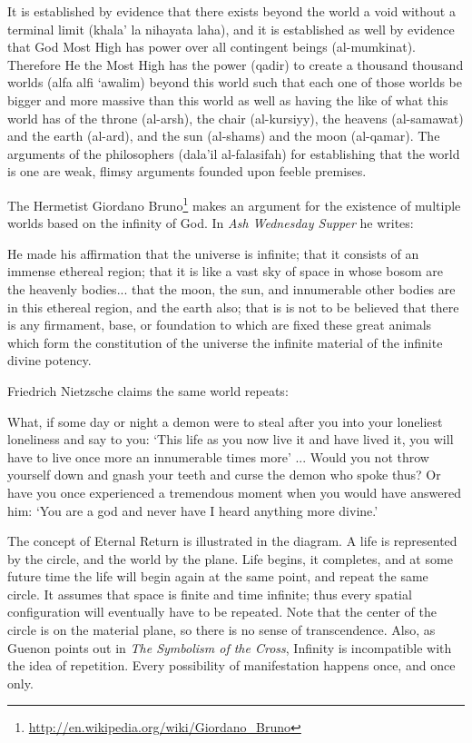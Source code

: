 \begin{quotex}
It is established by evidence that there exists beyond the world a void without a terminal limit (khala' la nihayata laha), and it is established as well by evidence that God Most High has power over all contingent beings (al-mumkinat). Therefore He the Most High has the power (qadir) to create a thousand thousand worlds (alfa alfi `awalim) beyond this world such that each one of those worlds be bigger and more massive than this world as well as having the like of what this world has of the throne (al-arsh), the chair (al-kursiyy), the heavens (al-samawat) and the earth (al-ard), and the sun (al-shams) and the moon (al-qamar). The arguments of the philosophers (dala'il al-falasifah) for establishing that the world is one are weak, flimsy arguments founded upon feeble premises.
\end{quotex}


The Hermetist Giordano Bruno\footnote{\url{http://en.wikipedia.org/wiki/Giordano_Bruno}} makes an argument for the existence of multiple worlds based on the infinity of God. In \emph{Ash Wednesday Supper} he writes:

\begin{quotex} He made his affirmation that the universe is infinite; that it consists of an immense ethereal region; that it is like a vast sky of space in whose bosom are the heavenly bodies... that the moon, the sun, and innumerable other bodies are in this ethereal region, and the earth also; that is is not to be believed that there is any firmament, base, or foundation to which are fixed these great animals which form the constitution of the universe the infinite material of the infinite divine potency.
\end{quotex}

Friedrich Nietzsche claims the same world repeats:

\begin{quotex}
What, if some day or night a demon were to steal after you into your loneliest loneliness and say to you: `This life as you now live it and have lived it, you will have to live once more an innumerable times more' ... Would you not throw yourself down and gnash your teeth and curse the demon who spoke thus? Or have you once experienced a tremendous moment when you would have answered him: `You are a god and never have I heard anything more divine.'
\end{quotex}


The concept of Eternal Return is illustrated in the diagram. A life is represented by the circle, and the world by the plane. Life begins, it completes, and at some future time the life will begin again at the same point, and repeat the same circle. It assumes that space is finite and time infinite; thus every spatial configuration will eventually have to be repeated. Note that the center of the circle is on the material plane, so there is no sense of transcendence. Also, as Guenon points out in \emph{The Symbolism of the Cross}, Infinity is incompatible with the idea of repetition. Every possibility of manifestation happens once, and once only.

